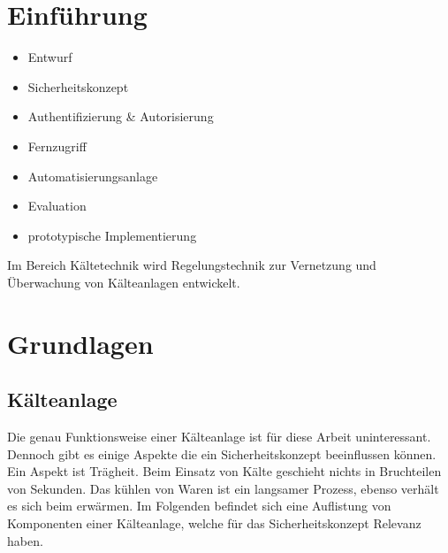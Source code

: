 \documentclass[11pt,a4paper]{report}
\begin{document}

\tableofcontents
\clearpage 


\chapter{Einführung} \label{chap:intro}

\begin{itemize}
\item Entwurf 
\item Sicherheitskonzept
\item Authentifizierung \& Autorisierung
\item Fernzugriff
\item Automatisierungsanlage
\item Evaluation
\item prototypische Implementierung
\end{itemize}
 
Im Bereich Kältetechnik wird Regelungstechnik zur Vernetzung und Überwachung von Kälteanlagen entwickelt. 
\chapter{Grundlagen} \label{chap:basics}

\section{Kälteanlage}

Die genau Funktionsweise einer Kälteanlage ist für diese Arbeit uninteressant. Dennoch gibt es einige Aspekte die ein Sicherheitskonzept beeinflussen können. Ein Aspekt ist Trägheit. Beim Einsatz von Kälte geschieht nichts in Bruchteilen von Sekunden. Das kühlen von Waren ist ein langsamer Prozess, ebenso verhält es sich beim erwärmen. Im Folgenden befindet sich eine Auflistung von Komponenten einer Kälteanlage, welche für das Sicherheitskonzept Relevanz haben.
\end{document}
